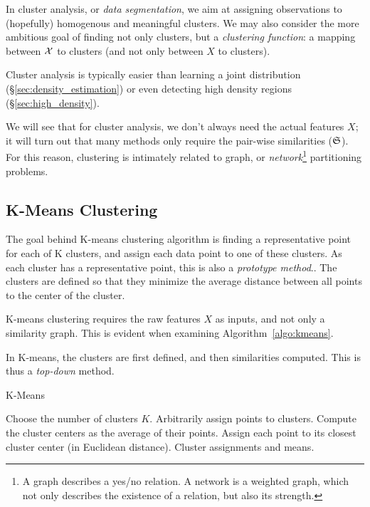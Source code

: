 In cluster analysis, or \emph{data segmentation}, we aim at assigning observations to (hopefully) homogenous and meaningful clusters. 
We may also consider the more ambitious goal of finding not only clusters, but a \emph{clustering function}: a mapping between $\mathcal{X}$ to clusters (and not only between $X$ to clusters).

Cluster analysis is typically easier than learning a joint distribution (\S\ref{sec:density_estimation}) or even detecting high density regions (\S\ref{sec:high_density}). 

We will see that for cluster analysis, we don't always need the actual features $X$; it will turn out that many methods only require the pair-wise similarities ($\mathfrak{S}$). 
For this reason, clustering is intimately related to graph, or \emph{network}\footnote{A graph describes a yes/no relation. A network is a weighted graph, which not only describes the existence of a relation, but also its strength.} partitioning problems.



\subsection{K-Means Clustering}
\label{sec:kmeans}



The goal behind K-means clustering algorithm is finding a representative point for each of K clusters, and assign each data point to one of these clusters. 
As each cluster has a representative point, this is also a \emph{prototype method}..
The clusters are defined so that they minimize the average distance between all points to the center of the cluster.

K-means clustering requires the raw features $X$ as inputs, and not only a similarity graph. 
This is evident when examining Algorithm~\ref{algo:kmeans}.

In K-means, the clusters are first defined, and then similarities computed. This is thus a \emph{top-down} method.

\begin{algorithm}[H]
\caption{K-Means}
\label{algo:kmeans}
\begin{algorithmic}
\State Choose the number of clusters $K$.
\State Arbitrarily assign points to clusters.
	\State Compute the cluster centers as the average of their points.
	\State Assign each point to its closest cluster center (in Euclidean distance).
\EndWhile
\State \Return Cluster assignments and means.
\end{algorithmic}
\end{algorithm}


